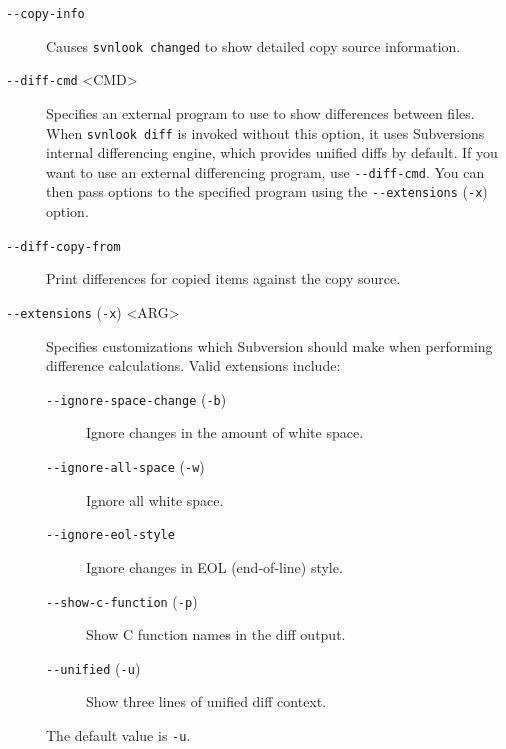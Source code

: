 \begin{description}
\item[\protect{}\label{svn.ref.svnlook.sw.copy_info}{}\texttt{-\/-copy-info}]
Causes \texttt{svnlook\ changed} to show detailed copy source
information.
\item[\protect{}\label{svn.ref.svnlook.sw.diff_cmd}{}\texttt{-\/-diff-cmd}
\textless CMD\textgreater{}]
Specifies an external program to use to show differences between files.
When \texttt{svnlook\ diff} is invoked without this option, it uses
Subversion\textquotesingle s internal differencing engine, which
provides unified diffs by default. If you want to use an external
differencing program, use \texttt{-\/-diff-cmd}. You can then pass
options to the specified program using the \texttt{-\/-extensions}
(\texttt{-x}) option.
\item[\protect{}\label{svn.ref.svnlook.sw.diff_copy_from}{}\texttt{-\/-diff-copy-from}]
Print differences for copied items against the copy source.
\item[\protect{}\label{svn.ref.svnlook.sw.extensions}{}\texttt{-\/-extensions}
(\texttt{-x}) \textless ARG\textgreater{}]
Specifies customizations which Subversion should make when performing
difference calculations. Valid extensions include:

\begin{description}
\item[\texttt{-\/-ignore-space-change} (\texttt{-b})]
Ignore changes in the amount of white space.
\item[\texttt{-\/-ignore-all-space} (\texttt{-w})]
Ignore all white space.
\item[\texttt{-\/-ignore-eol-style}]
Ignore changes in EOL (end-of-line) style.
\item[\texttt{-\/-show-c-function} (\texttt{-p})]
Show C function names in the diff output.
\item[\texttt{-\/-unified} (\texttt{-u})]
Show three lines of unified diff context.
\end{description}

The default value is \texttt{-u}.


\end{description}
